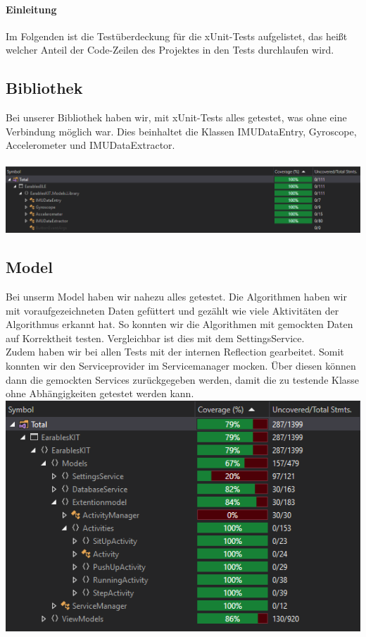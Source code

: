\documentclass[a4paper,12pt]{article}
\begin{document}
\paragraph{Einleitung}
Im Folgenden ist die Testüberdeckung für die xUnit-Tests aufgelistet, das heißt welcher Anteil der Code-Zeilen des Projektes in den Tests durchlaufen wird.

\subsection{Bibliothek}
Bei unserer Bibliothek haben wir, mit xUnit-Tests alles getestet, was ohne eine Verbindung  möglich war. Dies beinhaltet die Klassen IMUDataEntry, Gyroscope, Accelerometer und IMUDataExtractor.
\\ \\ 
\includegraphics[width=1\textwidth]{./bilder/BibTestCoverage/Testcoverage.PNG}
\subsection{Model}
Bei unserm Model haben wir nahezu alles getestet. Die Algorithmen haben wir mit voraufgezeichneten Daten gefüttert und gezählt wie viele Aktivitäten der Algorithmus erkannt hat. So konnten wir die Algorithmen mit gemockten Daten auf Korrektheit testen. Vergleichbar ist dies mit dem SettingsService. \\Zudem haben wir bei allen Tests mit der internen Reflection gearbeitet. Somit konnten wir den Serviceprovider im Servicemanager mocken. Über diesen können dann die gemockten Services zurückgegeben werden, damit die zu testende Klasse ohne Abhängigkeiten getestet werden kann.\\

\includegraphics[width=1\textwidth]{./bilder/Coverage/CoverageModel.PNG}
\end{document}
